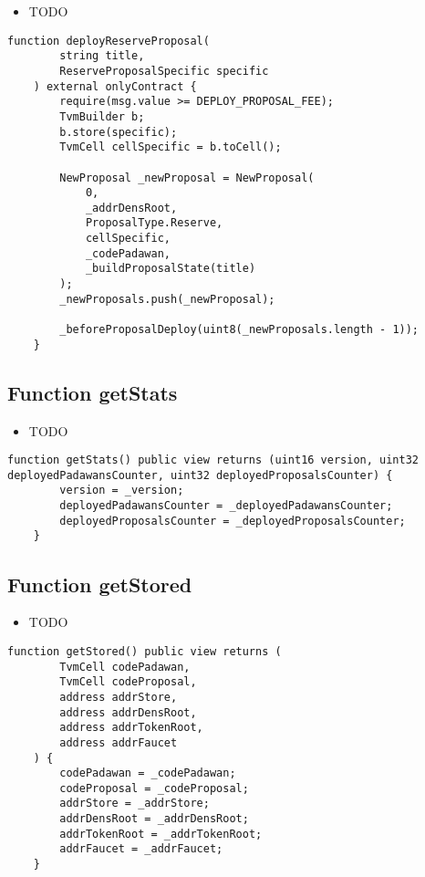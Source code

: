 \begin{itemize}
\item TODO
\end{itemize}

\begin{lstlisting}[firstnumber=112]
    function deployReserveProposal(
        string title,
        ReserveProposalSpecific specific
    ) external onlyContract {
        require(msg.value >= DEPLOY_PROPOSAL_FEE);
        TvmBuilder b;
        b.store(specific);
        TvmCell cellSpecific = b.toCell();

        NewProposal _newProposal = NewProposal(
            0,
            _addrDensRoot,
            ProposalType.Reserve,
            cellSpecific,
            _codePadawan,
            _buildProposalState(title)
        );
        _newProposals.push(_newProposal);
        
        _beforeProposalDeploy(uint8(_newProposals.length - 1));
    }
\end{lstlisting}

\subsection{Function getStats}

\begin{itemize}
\item TODO
\end{itemize}

\begin{lstlisting}[firstnumber=214]
    function getStats() public view returns (uint16 version, uint32 deployedPadawansCounter, uint32 deployedProposalsCounter) {
        version = _version;
        deployedPadawansCounter = _deployedPadawansCounter;
        deployedProposalsCounter = _deployedProposalsCounter;
    }
\end{lstlisting}

\subsection{Function getStored}

\begin{itemize}
\item TODO
\end{itemize}

\begin{lstlisting}[firstnumber=198]
    function getStored() public view returns (
        TvmCell codePadawan,
        TvmCell codeProposal,
        address addrStore,
        address addrDensRoot,
        address addrTokenRoot,
        address addrFaucet
    ) {
        codePadawan = _codePadawan;
        codeProposal = _codeProposal;
        addrStore = _addrStore;
        addrDensRoot = _addrDensRoot;
        addrTokenRoot = _addrTokenRoot;
        addrFaucet = _addrFaucet;
    }
\end{lstlisting}


